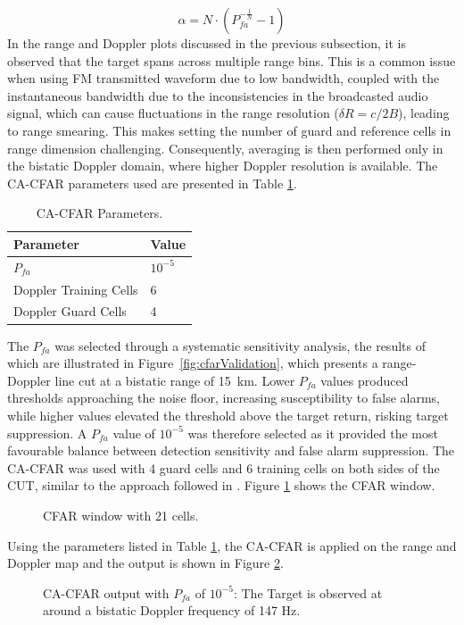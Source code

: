 \begin{equation}
    \alpha = N \cdot (P_{fa}^{-\frac{1}{N}}-1)
    \label{alpha}
\end{equation}
In the range and Doppler plots discussed in the previous subsection, it is observed that the target spans across multiple range bins. This is a common issue when using \ac{FM} transmitted waveform due to low bandwidth, coupled with the instantaneous bandwidth due to the inconsistencies in the broadcasted audio signal, which can cause fluctuations in the range resolution (\(\delta R = c/2B\)), leading to range smearing. This makes setting the number of guard and reference cells in range dimension challenging. Consequently, averaging is then performed only in the bistatic Doppler domain, where higher Doppler resolution is available. The \ac{CA-CFAR} parameters used are presented in Table \ref{tab:cacfartable}.

\begin{table}[ht!]
\centering
\caption{CA-CFAR Parameters.}
\label{tab:cacfartable}
\begin{tabular}{ll}
\hline
\textbf{Parameter} & \textbf{Value} \\
\toprule
\(P_{fa}\)  & \(10^{-5}\) \\
Doppler Training Cells & 6  \\
Doppler Guard Cells  & 4 \\
\bottomrule
\end{tabular}
\end{table}
 The \(P_{fa}\)  was selected through a systematic sensitivity analysis, the results of which are illustrated in Figure~\ref{fig:cfarValidation}, which presents a range-Doppler line cut at a bistatic range of 15~km. Lower \(P_{fa}\)  values produced thresholds approaching the noise floor, increasing susceptibility to false alarms, while higher values elevated the threshold above the target return, risking target suppression. A \(P_{fa}\) value of \(10^{-5}\)  was therefore selected as it provided the most favourable balance between detection sensitivity and false alarm suppression. The \ac{CA-CFAR} was used with 4 guard cells and 6 training cells on both sides of the \ac{CUT}, similar to the approach followed in \cite{De2015,tong2014}. Figure \ref{cfarwindow} shows the CFAR window.
\newline
\begin{figure}[H]
    \centering
    
    \caption{CFAR window with 21 cells.}
    \label{cfarwindow}
\end{figure}
Using the parameters listed in Table \ref{tab:cacfartable}, the \ac{CA-CFAR} is applied on the range and Doppler map and the output is shown in Figure \ref{fig:ca-cfar1}.
\begin{figure}[H]
    \centering
    
    \caption{CA-CFAR output with \(P_{fa}\) of \(10^{-5}\): The Target is observed at around a bistatic Doppler frequency of 147 Hz.}
    \label{fig:ca-cfar1}
\end{figure}

